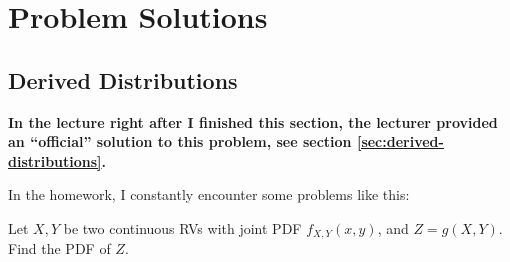 \chapter{Problem Solutions}


\section{Derived Distributions}
\textbf{In the lecture right after I finished this section, the lecturer provided an ``official'' solution to this problem, see section \ref{sec:derived-distributions}.}

In the homework, I constantly encounter some problems like this:
\begin{example}
    Let $X, Y$ be two continuous RVs with joint PDF $f_{X, Y}(x, y)$, and $Z = g(X, Y)$. Find the PDF of $Z$.
\end{example}


